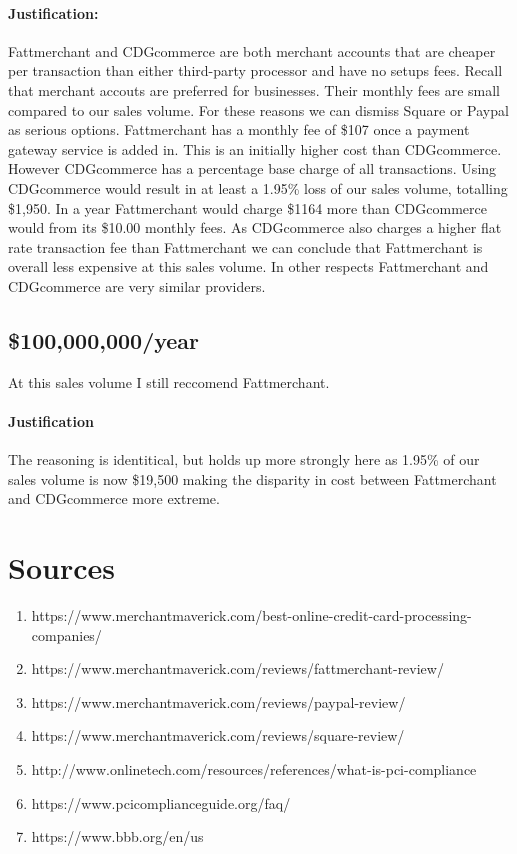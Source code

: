 \documentclass[letterpaper]{article}
\begin{document}
      \paragraph{Justification:}
        Fattmerchant and CDGcommerce are both merchant accounts that are cheaper per transaction than
        either third-party processor and have no setups fees. Recall that merchant accouts are preferred for businesses. Their monthly fees are small compared to our sales volume. For these reasons
        we can dismiss Square or Paypal as serious options.
        Fattmerchant has a monthly fee of \$107 once a payment gateway service is added in.
        This is an initially higher cost than CDGcommerce. However CDGcommerce has a percentage base charge of all transactions.
        Using CDGcommerce would result in at least a 1.95\% loss of our sales volume, totalling \$1,950. In a year Fattmerchant would charge
        \$1164 more than CDGcommerce would from its \$10.00 monthly fees. As CDGcommerce also charges a higher flat rate transaction fee than Fattmerchant
        we can conclude that Fattmerchant is overall less expensive at this sales volume.
        In other respects Fattmerchant and CDGcommerce are very similar providers.
    \subsection{\$100,000,000/year}
      At this sales volume I still reccomend Fattmerchant.
      \paragraph{Justification}
        The reasoning is identitical, but holds up more strongly here as 1.95\% of our sales volume is now \$19,500 making the disparity
        in cost between Fattmerchant and CDGcommerce more extreme.
  \section{Sources}
    \begin{enumerate}
      \item https://www.merchantmaverick.com/best-online-credit-card-processing-companies/
      \item https://www.merchantmaverick.com/reviews/fattmerchant-review/
      \item https://www.merchantmaverick.com/reviews/paypal-review/
      \item https://www.merchantmaverick.com/reviews/square-review/
      \item http://www.onlinetech.com/resources/references/what-is-pci-compliance
      \item https://www.pcicomplianceguide.org/faq/
      \item https://www.bbb.org/en/us
    \end{enumerate}
\end{document}
